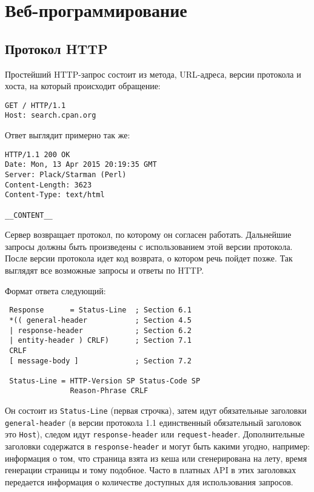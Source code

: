 \setcounter{chapter}{7}
\chapter{Веб-программирование}
\section{Протокол HTTP}
Простейший HTTP-запрос состоит из метода, URL-адреса, версии протокола и хоста, на который происходит обращение:
\begin{verbatim}
GET / HTTP/1.1
Host: search.cpan.org
\end{verbatim}
Ответ выглядит примерно так же:
\begin{verbatim}
HTTP/1.1 200 OK
Date: Mon, 13 Apr 2015 20:19:35 GMT
Server: Plack/Starman (Perl)
Content-Length: 3623
Content-Type: text/html

__CONTENT__
\end{verbatim}
Сервер возвращает протокол, по которому он согласен работать. Дальнейшие запросы должны быть произведены с использованием этой версии протокола. После версии протокола идет код возврата, о котором речь пойдет позже.
Так выглядят все возможные запросы и ответы по HTTP.

Формат ответа следующий:
\begin{verbatim}
 Response      = Status-Line  ; Section 6.1
 *(( general-header           ; Section 4.5
 | response-header            ; Section 6.2
 | entity-header ) CRLF)      ; Section 7.1
 CRLF
 [ message-body ]             ; Section 7.2

 Status-Line = HTTP-Version SP Status-Code SP
               Reason-Phrase CRLF
\end{verbatim}
Он состоит из \verb|Status-Line| (первая строчка), затем идут обязательные заголовки \verb|general-header| (в версии протокола 1.1 единственный обязательный заголовок это \verb|Host|), следом идут \verb|response-header| или \verb|request-header|.
Дополнительные заголовки содержатся в \verb|response-header| и могут быть какими угодно, например:
информация о том, что страница взята из кеша или сгенерирована на лету, время генерации страницы и тому подобное.
Часто в платных API в этих заголовках передается информация о количестве доступных для использования запросов.

